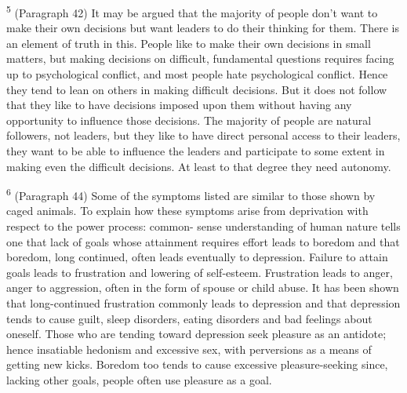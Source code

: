 \documentclass{article}
\begin{document}
\textsuperscript{5} (Paragraph 42) It may be argued that the majority of people don’t want to make their own 
decisions but want leaders to do their thinking for them.  There is an element of truth in 
this.  People like to make their own decisions in small matters, but making decisions on difficult, 
fundamental questions requires facing up to psychological conflict, and most people hate 
psychological conflict.  Hence they tend to lean on others in making difficult decisions.  But it 
does not follow that they like to have decisions imposed upon them without having any 
opportunity to influence those decisions.  The majority of people are natural followers, not 
leaders, but they like to have direct personal access to their leaders, they want to be able to 
influence the leaders and participate to some extent in making even the difficult decisions.  At 
least to that degree they need autonomy. \vspace{\baselineskip}

\textsuperscript{6} (Paragraph 44) Some of the symptoms listed are similar to those shown by caged animals.  To 
explain how these symptoms arise from deprivation with respect to the power process: common-
sense understanding of human nature tells one that lack of goals whose attainment requires effort 
leads to boredom and that boredom, long continued, often leads eventually to 
depression.  Failure to attain goals leads to frustration and lowering of self-esteem.  Frustration 
leads to anger, anger to aggression, often in the form of spouse or child abuse.  It has been shown 
that long-continued frustration commonly leads to depression and that depression tends to cause 
guilt, sleep disorders, eating disorders and bad feelings about oneself.  Those who are tending 
toward depression seek pleasure as an antidote; hence insatiable hedonism and excessive sex, 
with perversions as a means of getting new kicks.  Boredom too tends to cause excessive 
pleasure-seeking since, lacking other goals, people often use pleasure as a goal. \vspace{\baselineskip}
\end{document}
